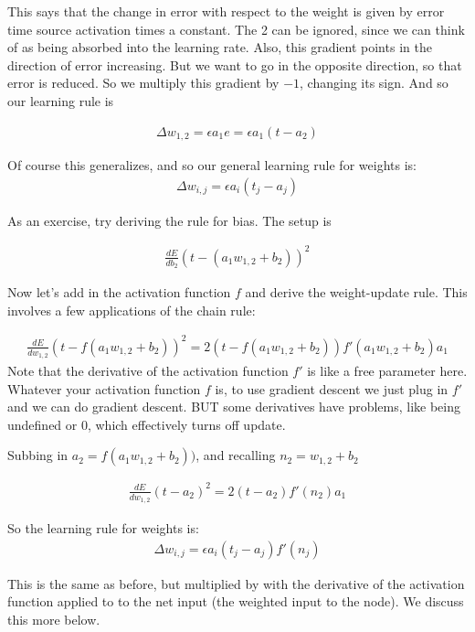 This says that the change in error with respect to the weight is given by error time source activation times a constant. The 2 can be ignored, since we can think of as being absorbed into the learning rate. Also, this gradient points in the direction of error increasing. But we want to go in the opposite direction, so that error is reduced. So we multiply this gradient by $-1$, changing its sign. And so our learning rule is 

\begin{eqnarray*}
\Delta w_{1,2}  =  \epsilon a_1 e  = \epsilon a_1 (t - a_2)
\end{eqnarray*} 

Of course this generalizes, and so our general learning rule for weights is:
\begin{eqnarray*}
\Delta w_{i,j}  =  \epsilon a_i (t_j - a_j)
\end{eqnarray*} 

As an exercise, try deriving the rule for bias. The setup is

\begin{eqnarray*}
\frac{dE}{db_{2}} (t - ( a_1 w_{1,2} + b_2))^2 
\end{eqnarray*}

Now let's add in the activation function $f$ and derive the weight-update rule.  This involves a few applications of the chain rule:

\begin{eqnarray*}
\frac{dE}{dw_{1,2}} (t - f(a_1w_{1,2} + b_2))^2   = 2 (t - f(a_1w_{1,2} + b_2)) f'(a_1w_{1,2} + b_2) a_1 
\end{eqnarray*}
Note that the derivative of the activation function $f'$ is like a free parameter here. Whatever your activation function $f$ is, to use gradient descent we just plug in $f'$ and we can do gradient descent. BUT some derivatives have problems, like being undefined or 0, which effectively turns off update.

Subbing in $a_2 = f(a_1w_{1,2} + b_2))$, and recalling $n_2 = w_{1,2} + b_2$ 

\begin{eqnarray*}
\frac{dE}{dw_{1,2}} (t - a_2)^2   = 2 (t - a_2) f'(n_2) a_1 
\end{eqnarray*}

So the learning rule for weights is:
\begin{eqnarray*}
\Delta w_{i,j}  =  \epsilon a_i (t_j - a_j) f'(n_j)
\end{eqnarray*} 

This is the same as before, but multiplied by with the derivative of the activation function applied to to the net input (the weighted input to the node). We discuss this more below.

